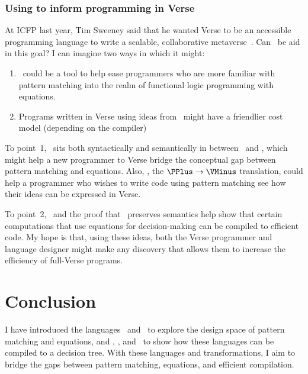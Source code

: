 \documentclass[manuscript,screen,review, 12pt, nonacm]{acmart}
\begin{document}
        \subsubsection{Using \VMinus to inform programming in Verse}
        \label{vminusandvc}
        
        At ICFP last year, Tim Sweeney said that he wanted Verse to be an
        accessible programming language to write a scalable, collaborative
        metaverse~\citep{timtalk}. Can \VMinus\ be aid in this goal? I can imagine
        two ways in which it might:
        
        \begin{enumerate}
            \item \VMinus\ could be  a tool to help ease programmers who are
            more familiar with pattern matching into the realm of functional
            logic programming with equations. 
            \item Programs written in Verse using ideas from \VMinus\ might have
            a friendlier cost model (depending on the compiler)
        \end{enumerate}
        
        To point~1, \VMinus\ sits both syntactically and semantically in between
        \PPlus\ and \VC, which might help a new programmer to Verse bridge the
        conceptual gap between pattern matching and equations. Also, \PtoVTran,
        the $\PPlus \rightarrow \VMinus$ translation, could help a programmer 
        who wishes to write code using pattern matching see how their ideas 
        can be expressed in Verse. 

        To point~2, \DTran\ and the proof that \DTran\ preserves semantics help
        show that certain computations that use equations for decision-making
        can be compiled to efficient code. My hope is that, using these ideas,
        both the Verse programmer and language designer might make any discovery
        that allows them to increase the efficiency of full-Verse programs. 

    \section{Conclusion}

    I have introduced the languages \PPlus\ and \VMinus\ to explore the design
    space of pattern matching and equations, and \D, \PtoVTran, and \DTran\ to
    show how these languages can be compiled to a decision tree. With these
    languages and transformations, I aim to bridge the gaps between pattern
    matching, equations, and efficient compilation. 
\end{document}
